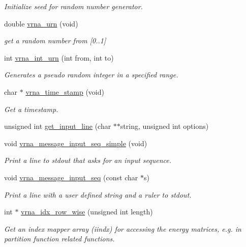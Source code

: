 \begin{DoxyCompactItemize}
\begin{DoxyCompactList}\small\item\em Initialize seed for random number generator. \end{DoxyCompactList}\item 
double \hyperlink{group__utils_ga384e256ebb295d04a14426179db0dd6e}{vrna\+\_\+urn} (void)
\begin{DoxyCompactList}\small\item\em get a random number from \mbox{[}0..1\mbox{]} \end{DoxyCompactList}\item 
int \hyperlink{group__utils_ga46111bb3747dbcf4609f0d40ae169ad9}{vrna\+\_\+int\+\_\+urn} (int from, int to)
\begin{DoxyCompactList}\small\item\em Generates a pseudo random integer in a specified range. \end{DoxyCompactList}\item 
char $\ast$ \hyperlink{group__utils_gad3bbe8d01afb1310609cb018d5290550}{vrna\+\_\+time\+\_\+stamp} (void)
\begin{DoxyCompactList}\small\item\em Get a timestamp. \end{DoxyCompactList}\item 
unsigned int \hyperlink{group__utils_ga8ef1835eb83f542396f59f0b205965e5}{get\+\_\+input\+\_\+line} (char $\ast$$\ast$string, unsigned int options)
\item 
void \hyperlink{group__utils_gaee1dd652ca5b9e56b096963a1576f73b}{vrna\+\_\+message\+\_\+input\+\_\+seq\+\_\+simple} (void)
\begin{DoxyCompactList}\small\item\em Print a line to {\itshape stdout} that asks for an input sequence. \end{DoxyCompactList}\item 
void \hyperlink{group__utils_gaf4d194d558b0c975f269de01dea52460}{vrna\+\_\+message\+\_\+input\+\_\+seq} (const char $\ast$s)
\begin{DoxyCompactList}\small\item\em Print a line with a user defined string and a ruler to stdout. \end{DoxyCompactList}\item 
int $\ast$ \hyperlink{group__utils_ga70b180e9ea764218a82647a1cd347445}{vrna\+\_\+idx\+\_\+row\+\_\+wise} (unsigned int length)
\begin{DoxyCompactList}\small\item\em Get an index mapper array (iindx) for accessing the energy matrices, e.\+g. in partition function related functions. \end{DoxyCompactList}\item 
$$
\end{DoxyCompactItemize}
